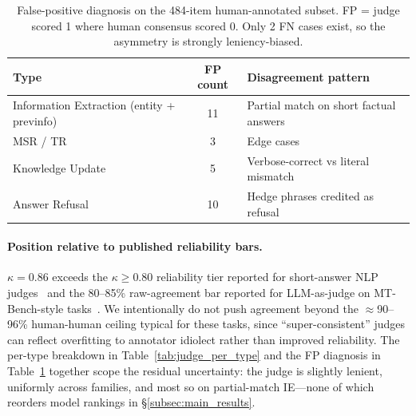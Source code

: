 \documentclass{llmxive}
\begin{document}
\begin{table}[!htbp]
\centering
\small
\begin{tabular}{@{}lcl@{}}
\toprule
\textbf{Type} & \textbf{FP count} & \textbf{Disagreement pattern} \\
\midrule
Information Extraction (entity + previnfo) & 11 & Partial match on short factual answers \\
MSR / TR & 3 & Edge cases \\
Knowledge Update & 5 & Verbose-correct vs literal mismatch \\
Answer Refusal & 10 & Hedge phrases credited as refusal \\
\bottomrule
\end{tabular}
\caption{False-positive diagnosis on the 484-item human-annotated subset. FP = judge scored 1 where human consensus scored 0. Only 2 FN cases exist, so the asymmetry is strongly leniency-biased.}
\label{tab:judge_fp}
\end{table}

\paragraph{Position relative to published reliability bars.}
$\kappa = 0.86$ exceeds the $\kappa \geq 0.80$ reliability tier reported for short-answer NLP judges~\cite{cohen1960coefficient} and the 80--85\% raw-agreement bar reported for LLM-as-judge on MT-Bench-style tasks~\cite{zheng2023judging}.
We intentionally do not push agreement beyond the ${\approx}$90--96\% human-human ceiling typical for these tasks, since ``super-consistent'' judges can reflect overfitting to annotator idiolect rather than improved reliability.
The per-type breakdown in Table~\ref{tab:judge_per_type} and the FP diagnosis in Table~\ref{tab:judge_fp} together scope the residual uncertainty: the judge is slightly lenient, uniformly across families, and most so on partial-match IE---none of which reorders model rankings in \S\ref{subsec:main_results}.
\end{document}
